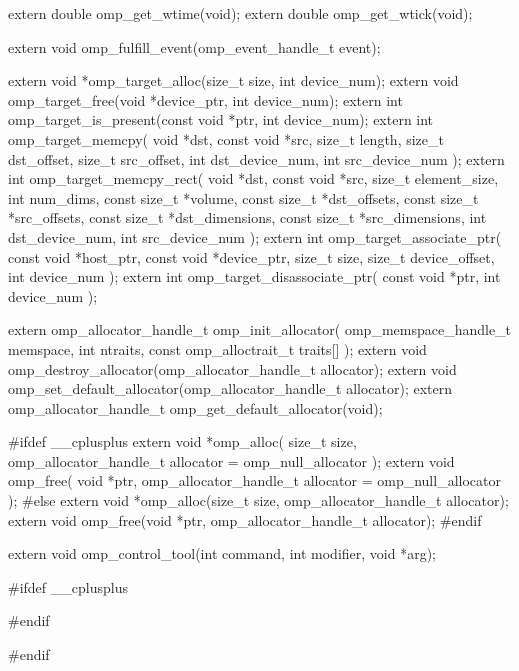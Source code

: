 {\begin{ompcFunction}
{extern double omp_get_wtime(void);
extern double omp_get_wtick(void);

extern void omp_fulfill_event(omp_event_handle_t event);

extern void *omp_target_alloc(size_t size, int device_num);
extern void omp_target_free(void *device_ptr, int device_num);
extern int omp_target_is_present(const void *ptr, int device_num);
extern int omp_target_memcpy(
  void *dst,
  const void *src,
  size_t length,
  size_t dst_offset,
  size_t src_offset,
  int dst_device_num,
  int src_device_num
);
extern int omp_target_memcpy_rect(
  void *dst,
  const void *src,
  size_t element_size,
  int num_dims,
  const size_t *volume,
  const size_t *dst_offsets,
  const size_t *src_offsets,
  const size_t *dst_dimensions,
  const size_t *src_dimensions,
  int dst_device_num,
  int src_device_num
);
extern int omp_target_associate_ptr(
  const void *host_ptr,
  const void *device_ptr,
  size_t size,
  size_t device_offset,
  int device_num
);
extern int omp_target_disassociate_ptr(
  const void *ptr,
  int device_num
);

extern omp_allocator_handle_t omp_init_allocator(
  omp_memspace_handle_t memspace,
  int ntraits,
  const omp_alloctrait_t traits[]
);
extern void omp_destroy_allocator(omp_allocator_handle_t allocator);
extern void omp_set_default_allocator(omp_allocator_handle_t allocator);
extern omp_allocator_handle_t omp_get_default_allocator(void);

#ifdef __cplusplus
extern void *omp_alloc(
  size_t size,
  omp_allocator_handle_t allocator = omp_null_allocator
);
extern void omp_free(
  void *ptr,
  omp_allocator_handle_t allocator = omp_null_allocator
);
#else
extern void *omp_alloc(size_t size, omp_allocator_handle_t allocator);
extern void omp_free(void *ptr, omp_allocator_handle_t allocator);
#endif

extern void omp_control_tool(int command, int modifier, void *arg);

#ifdef __cplusplus
}
#endif

#endif
\end{ompcFunction}} %


